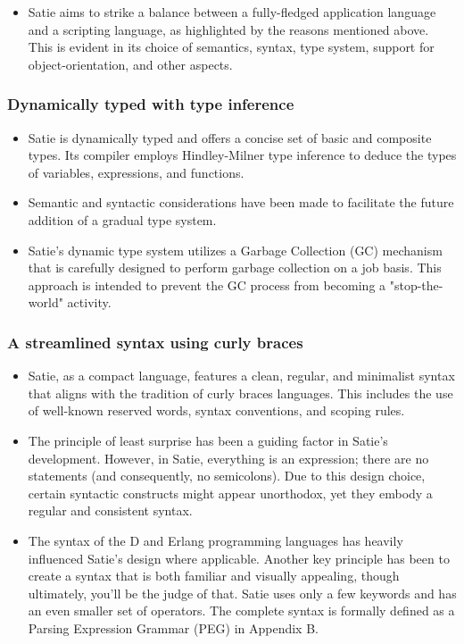 \begin{itemize}
\tightlist
\item
  Satie aims to strike a balance between a fully-fledged application
  language and a scripting language, as highlighted by the reasons
  mentioned above. This is evident in its choice of semantics, syntax,
  type system, support for object-orientation, and other aspects.
\end{itemize}

\hypertarget{dynamically-typed-with-type-inference}{%
\subsubsection{Dynamically typed with type
inference}\label{dynamically-typed-with-type-inference}}

\begin{itemize}
\item
  Satie is dynamically typed and offers a concise set of basic and
  composite types. Its compiler employs Hindley-Milner type inference to
  deduce the types of variables, expressions, and functions.
\item
  Semantic and syntactic considerations have been made to facilitate the
  future addition of a gradual type system.
\item
  Satie's dynamic type system utilizes a Garbage Collection (GC)
  mechanism that is carefully designed to perform garbage collection on
  a job basis. This approach is intended to prevent the GC process from
  becoming a "stop-the-world" activity.
\end{itemize}

\hypertarget{a-streamlined-syntax-using-curly-braces}{%
\subsubsection{A streamlined syntax using curly
braces}\label{a-streamlined-syntax-using-curly-braces}}

\begin{itemize}
\item
  Satie, as a compact language, features a clean, regular, and
  minimalist syntax that aligns with the tradition of curly braces
  languages. This includes the use of well-known reserved words, syntax
  conventions, and scoping rules.
\item
  The principle of least surprise has been a guiding factor in Satie's
  development. However, in Satie, everything is an expression; there are
  no statements (and consequently, no semicolons). Due to this design
  choice, certain syntactic constructs might appear unorthodox, yet they
  embody a regular and consistent syntax.
\item
  The syntax of the D and Erlang programming languages has heavily
  influenced Satie's design where applicable. Another key principle has
  been to create a syntax that is both familiar and visually appealing,
  though ultimately, you'll be the judge of that. Satie uses only a few
  keywords and has an even smaller set of operators. The complete syntax
  is formally defined as a Parsing Expression Grammar (PEG) in Appendix
  B.
\end{itemize}

